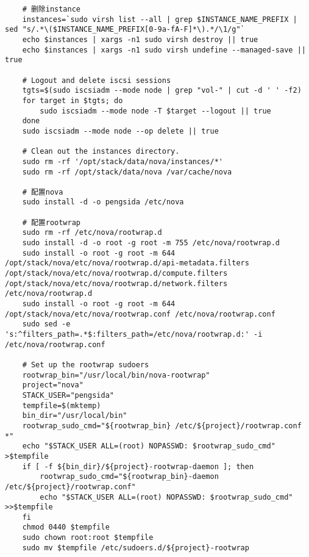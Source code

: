 \documentclass[a4paper,left=1.5cm,right=1.5cm,11pt]{article}
\begin{document}
\begin{lstlisting}
	# 删除instance
	instances=`sudo virsh list --all | grep $INSTANCE_NAME_PREFIX | sed "s/.*\($INSTANCE_NAME_PREFIX[0-9a-fA-F]*\).*/\1/g"`
	echo $instances | xargs -n1 sudo virsh destroy || true
	echo $instances | xargs -n1 sudo virsh undefine --managed-save || true

	# Logout and delete iscsi sessions
	tgts=$(sudo iscsiadm --mode node | grep "vol-" | cut -d ' ' -f2)
	for target in $tgts; do
		sudo iscsiadm --mode node -T $target --logout || true
	done
	sudo iscsiadm --mode node --op delete || true
	
	# Clean out the instances directory.
	sudo rm -rf '/opt/stack/data/nova/instances/*'
	sudo rm -rf /opt/stack/data/nova /var/cache/nova

	# 配置nova
	sudo install -d -o pengsida /etc/nova
	
	# 配置rootwrap
	sudo rm -rf /etc/nova/rootwrap.d
	sudo install -d -o root -g root -m 755 /etc/nova/rootwrap.d
	sudo install -o root -g root -m 644 /opt/stack/nova/etc/nova/rootwrap.d/api-metadata.filters /opt/stack/nova/etc/nova/rootwrap.d/compute.filters /opt/stack/nova/etc/nova/rootwrap.d/network.filters /etc/nova/rootwrap.d
	sudo install -o root -g root -m 644 /opt/stack/nova/etc/nova/rootwrap.conf /etc/nova/rootwrap.conf
	sudo sed -e 's:^filters_path=.*$:filters_path=/etc/nova/rootwrap.d:' -i /etc/nova/rootwrap.conf
	
	# Set up the rootwrap sudoers
	rootwrap_bin="/usr/local/bin/nova-rootwrap"
	project="nova"
	STACK_USER="pengsida"
	tempfile=$(mktemp)
	bin_dir="/usr/local/bin"
    rootwrap_sudo_cmd="${rootwrap_bin} /etc/${project}/rootwrap.conf *"
    echo "$STACK_USER ALL=(root) NOPASSWD: $rootwrap_sudo_cmd" >$tempfile
	if [ -f ${bin_dir}/${project}-rootwrap-daemon ]; then
        rootwrap_sudo_cmd="${rootwrap_bin}-daemon /etc/${project}/rootwrap.conf"
        echo "$STACK_USER ALL=(root) NOPASSWD: $rootwrap_sudo_cmd" >>$tempfile
    fi
	chmod 0440 $tempfile
    sudo chown root:root $tempfile
    sudo mv $tempfile /etc/sudoers.d/${project}-rootwrap
	\end{lstlisting}
	
\end{document}
